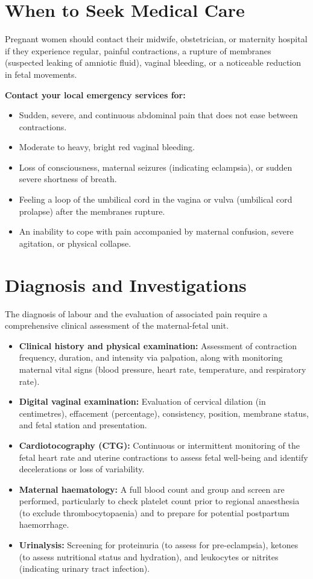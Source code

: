 \section*{When to Seek Medical Care}
Pregnant women should contact their midwife, obstetrician, or maternity hospital if they experience regular, painful contractions, a rupture of membranes (suspected leaking of amniotic fluid), vaginal bleeding, or a noticeable reduction in fetal movements.

\textbf{Contact your local emergency services for:}
\begin{itemize}
    \item Sudden, severe, and continuous abdominal pain that does not ease between contractions.
    \item Moderate to heavy, bright red vaginal bleeding.
    \item Loss of consciousness, maternal seizures (indicating eclampsia), or sudden severe shortness of breath.
    \item Feeling a loop of the umbilical cord in the vagina or vulva (umbilical cord prolapse) after the membranes rupture.
    \item An inability to cope with pain accompanied by maternal confusion, severe agitation, or physical collapse.
\end{itemize}

\section*{Diagnosis and Investigations}
The diagnosis of labour and the evaluation of associated pain require a comprehensive clinical assessment of the maternal-fetal unit.

\begin{itemize}
    \item \textbf{Clinical history and physical examination:} Assessment of contraction frequency, duration, and intensity via palpation, along with monitoring maternal vital signs (blood pressure, heart rate, temperature, and respiratory rate).
    \item \textbf{Digital vaginal examination:} Evaluation of cervical dilation (in centimetres), effacement (percentage), consistency, position, membrane status, and fetal station and presentation.
    \item \textbf{Cardiotocography (CTG):} Continuous or intermittent monitoring of the fetal heart rate and uterine contractions to assess fetal well-being and identify decelerations or loss of variability.
    \item \textbf{Maternal haematology:} A full blood count and group and screen are performed, particularly to check platelet count prior to regional anaesthesia (to exclude thrombocytopaenia) and to prepare for potential postpartum haemorrhage.
    \item \textbf{Urinalysis:} Screening for proteinuria (to assess for pre-eclampsia), ketones (to assess nutritional status and hydration), and leukocytes or nitrites (indicating urinary tract infection).
\end{itemize}

